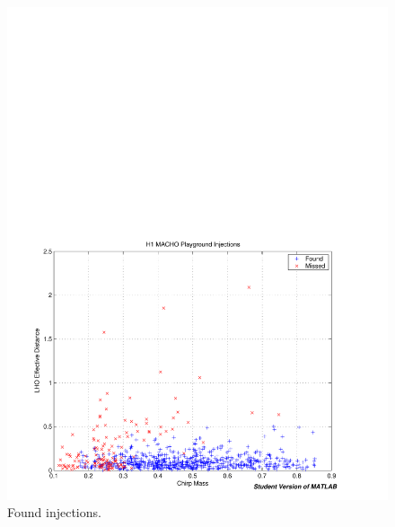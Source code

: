 \begin{figure}[p]
\begin{center}
\includegraphics[width=\textwidth]{analysis/figures/mchirp_found_missed}
\end{center}
\caption{\label{f:mchirp_eff}%
Found injections.
}
\end{figure}

